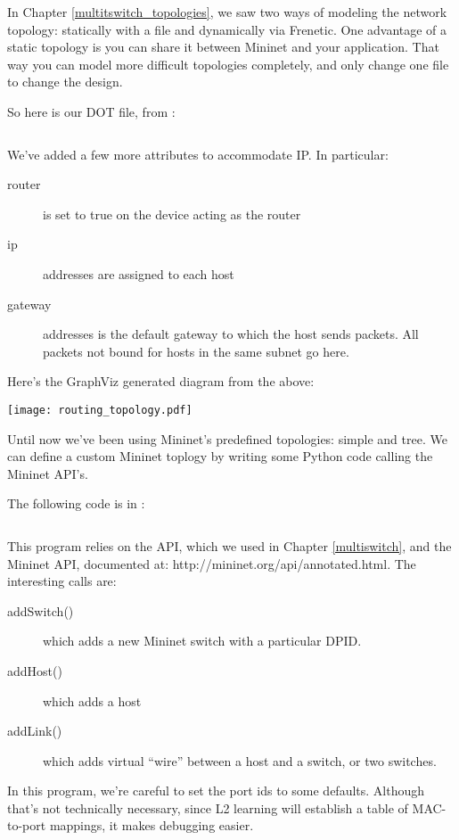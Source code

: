 In Chapter \ref{multitswitch_topologies}, we saw two ways of modeling the network topology:
statically with a  file and dynamically via Frenetic.  One advantage of a
static topology is you can share it between Mininet and your application.  That 
way you can model more difficult topologies completely, and only change one file
to change the design.  

So here is our DOT file, from :

\inputminted{python}{code/routing/topology.dot}

We've added a few more attributes to accommodate IP.  In particular:

\begin{description}
\item[router] is set to true on the device acting as the router
\item[ip] addresses are assigned to each host 
\item[gateway] addresses is the default gateway to which the host sends packets.  All packets not
bound for hosts in the same subnet go here.   
\end{description}

Here's the GraphViz generated diagram from the above:

\texttt{[image: routing\_topology.pdf]}

Until now we've been using Mininet's predefined topologies: simple and tree.  We
can define a custom Mininet toplogy by writing some Python code calling the Mininet
API's.  

The following code is in :

\inputminted{python}{code/routing/mn_dot_topology.py}

This program relies on the  API, which we used in Chapter \ref{multiswitch}, and 
the Mininet API, documented at: http://mininet.org/api/annotated.html.  The interesting calls are:

\begin{description}
\item[addSwitch()] which adds a new Mininet switch with a particular DPID.
\item[addHost()] which adds a host
\item[addLink()] which adds virtual ``wire'' between a host and a switch, or two switches.
\end{description}

In this program, we're careful to set the port ids to some defaults.  Although that's not
technically necessary, since L2 learning will establish a table of MAC-to-port mappings,
it makes debugging easier.    

